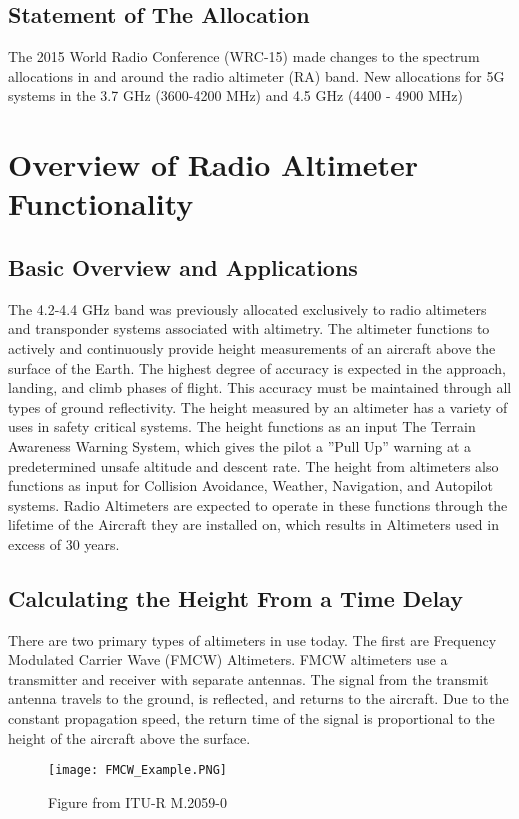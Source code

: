 \subsection{Statement of The Allocation}
The 2015 World Radio Conference (WRC-15) made changes to the spectrum allocations in and around the radio altimeter (RA) band. New allocations for 5G systems in the 3.7 GHz (3600-4200 MHz) and 4.5 GHz (4400 - 4900 MHz)

\section{Overview of Radio Altimeter Functionality}

\subsection{Basic Overview and Applications}
The 4.2-4.4 GHz band was previously allocated exclusively to radio altimeters and transponder systems associated with altimetry. The altimeter functions to actively and continuously provide height measurements of an aircraft above the surface of the Earth. The highest degree of accuracy is expected in the approach, landing, and climb phases of flight. This accuracy must be maintained through all types of ground reflectivity. The height measured by an altimeter has a variety of uses in safety critical systems. The height functions as an input The Terrain Awareness Warning System, which gives the pilot a  ''Pull Up'' warning at a predetermined unsafe altitude and descent rate. The height from altimeters also functions as input for Collision Avoidance, Weather, Navigation, and Autopilot systems. Radio Altimeters are expected to operate in these functions through the lifetime of the Aircraft they are installed on, which results in Altimeters used in excess of 30 years.

\subsection{Calculating the Height From a Time Delay}
There are two primary types of altimeters in use today. The first are Frequency Modulated Carrier Wave (FMCW) Altimeters. FMCW altimeters use a transmitter and receiver with separate antennas. The signal from the transmit antenna travels to the ground, is reflected, and returns to the aircraft. Due to the constant propagation speed, the return time of the signal is proportional to the height of the aircraft above the surface. 
\begin{figure}
 \centering
 \texttt{[image: FMCW\_Example.PNG]}
 \caption{Figure from ITU-R M.2059-0}
 \label{fig:FMCW}
\end{figure}

